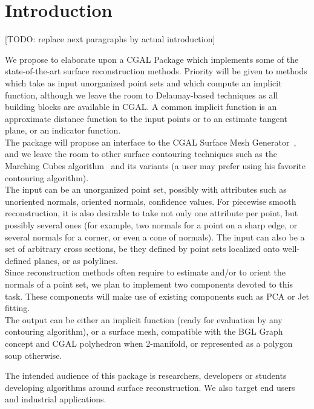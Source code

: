 \section{Introduction}

[TODO: replace next paragraphs by actual introduction]

We propose to elaborate upon a CGAL Package which implements some
of the state-of-the-art surface reconstruction methods. Priority will
be given to methods which take as input unorganized point sets and
which compute an implicit function, although we leave the room to
Delaunay-based techniques as all building blocks are available in
CGAL. A common implicit function is an approximate distance function
to the input points or to an estimate tangent plane, or an indicator
function.\\


The package will propose an interface to the CGAL Surface Mesh Generator~\cite{mariette06,oudot05},
and we leave the room to other surface contouring techniques such
as the Marching Cubes algorithm~\cite{37422} and its variants (a
user may prefer using his favorite contouring algorithm).\\


The input can be an unorganized point set, possibly with attributes
such as unoriented normals, oriented normals, confidence values. For
piecewise smooth reconstruction, it is also desirable to take not
only one attribute per point, but possibly several ones (for example,
two normals for a point on a sharp edge, or several normals for a
corner, or even a cone of normals). The input can also be a set of
arbitrary cross sections, be they defined by point sets localized
onto well-defined planes, or as polylines.\\


Since reconstruction methods often require to estimate and/or to orient
the normals of a point set, we plan to implement two components devoted
to this task. These components will make use of existing components
such as PCA or Jet fitting.\\


The output can be either an implicit function (ready for evaluation
by any contouring algorithm), or a surface mesh, compatible with the
BGL Graph concept and CGAL polyhedron when 2-manifold, or represented
as a polygon soup otherwise.


The intended audience of this package is researchers, developers or
students developing algorithms around surface reconstruction. We also
target end users and industrial applications.

